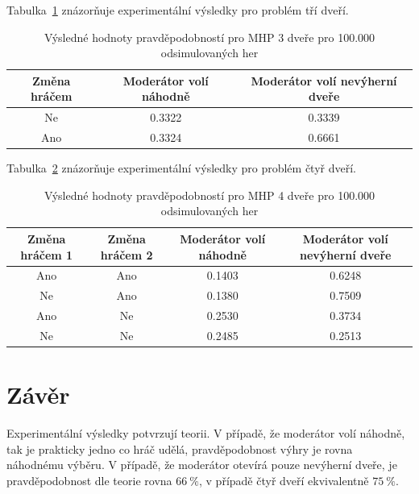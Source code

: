 Tabulka~\ref{table:table1} znázorňuje experimentální výsledky pro problém tří dveří.

\begin{table}[htb]
    \centering

    \begin{tabular}{ccc}
        \toprule

        Změna hráčem    & Moderátor volí náhodně    & Moderátor volí nevýherní dveře    \\ \midrule
        Ne              & 0.3322                    & 0.3339                            \\
        Ano             & 0.3324                    & 0.6661                            \\
          
        \bottomrule
    \end{tabular}

    \caption{Výsledné hodnoty pravděpodobností pro MHP 3 dveře pro 100.000 odsimulovaných her}
    \label{table:table1}
\end{table}
\FloatBarrier

Tabulka~\ref{table:table2} znázorňuje experimentální výsledky pro problém čtyř dveří.

\begin{table}[htb]
    \centering

    \begin{tabular}{cccc}
        \toprule

        Změna hráčem 1  & Změna hráčem 2    & Moderátor volí náhodně    & Moderátor volí nevýherní dveře    \\ \midrule
        Ano             & Ano               & 0.1403                    & 0.6248                            \\
        Ne              & Ano               & 0.1380                    & 0.7509                            \\
        Ano             & Ne                & 0.2530                    & 0.3734                            \\
        Ne              & Ne                & 0.2485                    & 0.2513                            \\

        \bottomrule
    \end{tabular}

    \caption{Výsledné hodnoty pravděpodobností pro MHP 4 dveře pro 100.000 odsimulovaných her}
    \label{table:table2}
\end{table}
\FloatBarrier

\section{Závěr}

Experimentální výsledky potvrzují teorii.
V případě, že moderátor volí náhodně, tak je prakticky jedno co hráč udělá, pravděpodobnost výhry je rovna náhodnému výběru.
V případě, že moderátor otevírá pouze nevýherní dveře, je pravděpodobnost dle teorie rovna \( 66 \: \% \), v případě čtyř dveří ekvivalentně \( 75 \: \% \).
